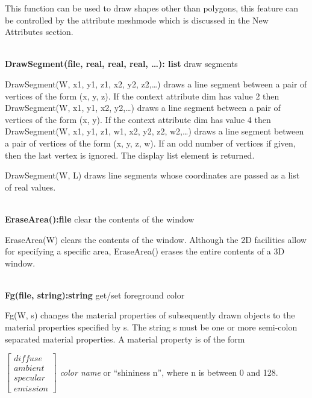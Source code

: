 \documentclass[letterpaper]{article}
\begin{document}
\bigskip

This function can be used to draw shapes other than polygons, this
feature can be controlled by the attribute \textsf{meshmode} which is
discussed in the New Attributes section.

\noindent\hrulefill\\
\noindent\textsf{\textbf{DrawSegment(file, real, real, real, {\dots}): list}}
\hfill draw segments


\bigskip

\textsf{DrawSegment(W, x1, y1, z1, x2, y2, z2,{\dots})} draws a line
segment between a pair of vertices of the form (x, y, z). If the
context attribute \textsf{dim} has value 2 then
\textsf{DrawSegment(W, x1, y1, x2, y2,{\dots})}
draws a line segment between a pair of
vertices of the form (x, y). If the context attribute \textsf{dim} has
value 4 then
\textsf{DrawSegment(W, x1, y1, z1, w1, x2, y2, z2, w2,{\dots})}
draws a line segment between a pair of vertices of the
form (x, y, z, w). If an odd number of vertices if given, then the
last vertex is ignored. The display list element is returned.


\bigskip

DrawSegment(W, L) draws line segments whose coordinates are passed
as a list of real values.


\bigskip

\noindent\hrulefill\\
\noindent\textsf{\textbf{EraseArea():file}} \hfill clear the contents of the window


\bigskip

\textsf{EraseArea(W)} clears the contents of the window. Although the 2D facilities allow for specifying a specific
area, \textsf{EraseArea()} erases the entire contents of a 3D window.

\noindent\hrulefill\\
\noindent\textsf{\textbf{Fg(file, string):string}} \hfill get/set foreground color


\bigskip

\textsf{Fg(W, s)} changes the material properties of subsequently
drawn objects to the material properties specified by s. The string s
must be one or more semi-colon separated material properties. A
material property is of the form

$\left[
\begin{array}{l}
diffuse\\ambient\\specular\\emission
\end{array}
\right]$ \textsf{\textit{color name}} or \textsf{``shininess n''},
where \textsf{n} is between \textsf{0} and \textsf{128}.
\end{document}
